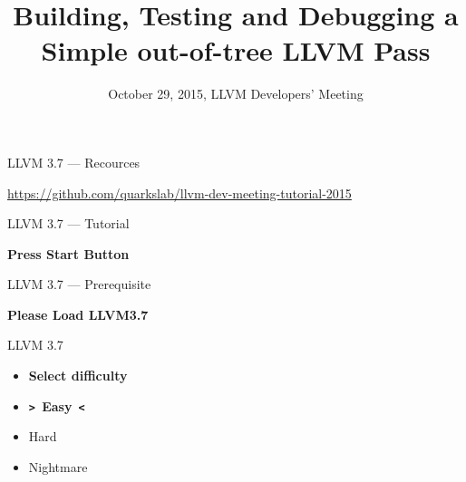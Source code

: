 \documentclass[14pt]{beamer}
\title{Building, Testing and Debugging a Simple out-of-tree LLVM Pass}
\date{October 29, 2015, LLVM Developers' Meeting}
\begin{document}
{
	\begin{frame}
        \maketitle
	\end{frame}
}


    \begin{frame}{LLVM 3.7 --- Recources}
        \begin{center}
            \url{https://github.com/quarkslab/llvm-dev-meeting-tutorial-2015}
        \end{center}
    \end{frame}


    \begin{frame}{LLVM 3.7 --- Tutorial}
        \begin{center}
            \textbf{\Large Press Start Button}
        \end{center}
    \end{frame}

    \begin{frame}{LLVM 3.7 --- Prerequisite}
        \begin{center}
            \textbf{\Large Please Load LLVM3.7}
        \end{center}
    \end{frame}

    \begin{frame}{LLVM 3.7}
        \begin{center}
            \begin{itemize}
                \centering
                \item[]\alert{\bf Select difficulty}\vspace{1em}
                \item[] \textbf{\texttt{>~}Easy\texttt{~<}}
                \item[] Hard
                \item[] Nightmare
            \end{itemize}
        \end{center}
    \end{frame}
\end{document}
